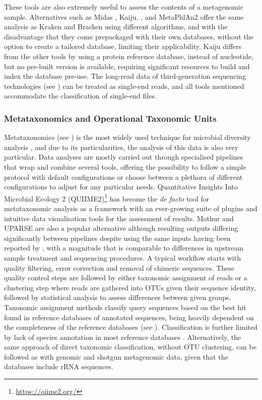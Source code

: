 These tools are also extremely useful to assess the contents of a metagenomic sample. Alternatives such as Midas \citep{nayfach_integrated_2016}, Kaiju, \citep{menzel_fast_2016}, and MetaPhlAn2 \citep{truong_metaphlan2_2015} offer the same analysis as Kraken and Bracken using different algorithms, and with the disadvantage that they come prepackaged with their own databases, without the option to create a tailored database, limiting their applicability. Kaiju differs from the other tools by using a protein reference database, instead of nucleotide, but no pre-built version is available, requiring significant resources to build and index the database pre-use. The long-read data of third-generation sequencing technologies (see ) can be treated as single-end reads, and all tools mentioned accommodate the classification of single-end files. 

\subsubsection{Metataxonomics and Operational Taxonomic Units}

Metataxonomics (see ) is the most widely used technique for microbial diversity analysis \citep{hilton_metataxonomic_2016}, and due to its particularities, the analysis of this data is also very particular. Data analyses are mostly carried out through specialised pipelines that wrap and combine several tools, offering the possibility to follow a simple protocol with default configurations or choose between a plethora of different configurations to adjust for any particular needs. Quantitative Insights Into Microbial Ecology 2 (QUIIME2)\footnote{\url{https://qiime2.org/}} \citep{bolyen_reproducible_2019} has become the \textit{de facto} tool for metataxonomic analysis as a framework with an ever-growing suite of plugins and intuitive data visualisation tools for the assessment of results. Mothur \citep{schloss_introducing_2009} and UPARSE \citep{edgar_uparse_2013} are also a popular alternative although resulting outputs differing significantly between pipelines despite using the same inputs having been reported by \cite{marizzoni_comparison_2020}, with a magnitude that is comparable to differences in upstream sample treatment and sequencing procedures.  A typical workflow starts with quality filtering, error correction and removal of chimeric sequences. These quality control steps are followed by either taxonomic assignment of reads or a clustering step where reads are gathered into OTUs given their sequence identity, followed by statistical analysis to assess differences between given groups. Taxonomic assignment methods classify query sequences based on the best hit found in reference databases of annotated sequences, being heavily dependent on the completeness of the reference databases (see ). Classification is further limited by lack of species annotation in most reference databases \citep{westcott_novo_2015}. Alternatively, the same approach of direct taxonomic classification, without OTU clustering, can be followed as with genomic and shotgun metagenomic data, given that the databases include rRNA sequences.

